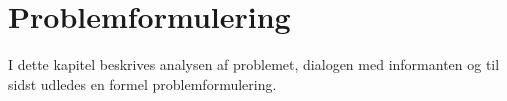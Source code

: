 \chapter{Problemformulering}
I dette kapitel beskrives analysen af problemet, dialogen med informanten og til sidst udledes en formel problemformulering.

